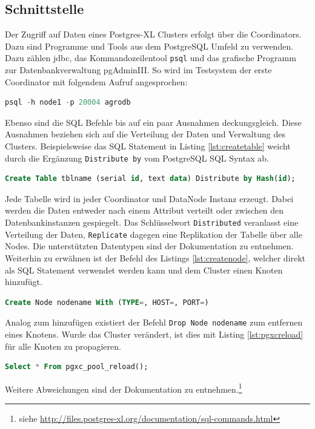 \subsection{Schnittstelle}
\label{subsection:interface}
Der Zugriff auf Daten eines Postgres-XL Clusters erfolgt über die Coordinators.
Dazu sind Programme und Tools aus dem PostgreSQL Umfeld zu verwenden.
Dazu zählen \Gls{jdbc}, das Kommandozeilentool \verb+psql+ und das grafische Programm zur Datenbankverwaltung pgAdminIII.
So wird im Testsystem der erste Coordinator mit folgendem Aufruf angesprochen:\begin{lstlisting}[language=sql,caption={Verbindung zu erstem Coordinator herstellen}]
psql -h node1 -p 20004 agrodb
\end{lstlisting}
Ebenso sind die SQL Befehle bis auf ein paar Ausnahmen deckungsgleich.
Diese Ausnahmen beziehen sich auf die Verteilung der Daten und Verwaltung des Clusters.
Beispielsweise das SQL Statement in Listing \ref{lst:createtable} weicht durch die Ergänzung \verb+Distribute by+ vom PostgreSQL SQL Syntax ab.
\begin{lstlisting}[language=sql,caption={SQL Query zum erzeugen einer Tabelle in Postgres-XL},label=lst:createtable]
Create Table tblname (serial id, text data) Distribute by Hash(id);
\end{lstlisting}
Jede Tabelle wird in jeder Coordinator und DataNode Instanz erzeugt.
Dabei werden die Daten entweder nach einem Attribut verteilt oder zwischen den Datenbankinstanzen gespiegelt.
Das Schlüsselwort \verb+Distributed+ veranlasst eine Verteilung der Daten, \verb+Replicate+ dagegen eine Replikation der Tabelle über alle Nodes.
Die unterstützten Datentypen sind der Dokumentation zu entnehmen.
Weiterhin zu erwähnen ist der Befehl des Listings \ref{lst:createnode}, welcher direkt als SQL Statement verwendet werden kann und dem Cluster einen Knoten hinzufügt.
\begin{lstlisting}[language=sql,caption={SQL Query zum hinzufügen eines aktiven Knoten in einen Postgres-XL Cluster},label=lst:createnode]
Create Node nodename With (TYPE=, HOST=, PORT=)
\end{lstlisting}
Analog zum hinzufügen existiert der Befehl \verb+Drop Node nodename+ zum entfernen eines Knotens.
Wurde das Cluster verändert, ist dies mit Listing \ref{lst:pgxcreload} für alle Knoten zu propagieren.
\begin{lstlisting}[language=sql,caption={SQL Query  zur Aktualisierung der Cluster Zusammensetzung},label=lst:pgxcreload]
Select * From pgxc_pool_reload();
\end{lstlisting}
Weitere Abweichungen sind der Dokumentation zu entnehmen.\footnote{siehe \url{http://files.postgres-xl.org/documentation/sql-commands.html}}

